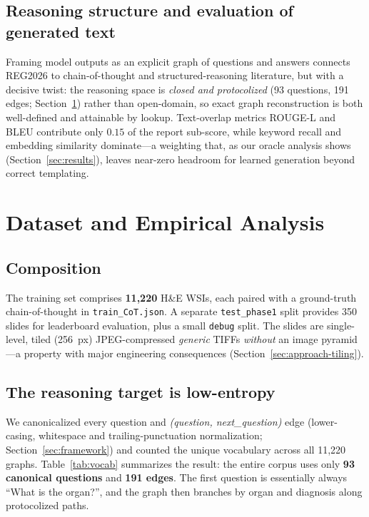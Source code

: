 \documentclass[11pt,a4paper]{article}
\newcommand{\code}[1]{\texttt{\small #1}}
\begin{document}
\subsection{Reasoning structure and evaluation of generated text}
Framing model outputs as an explicit graph of questions and answers connects REG2026 to
chain-of-thought and structured-reasoning literature, but with a decisive twist: the reasoning
space is \emph{closed and protocolized} (93 questions, 191 edges; Section~\ref{sec:data}) rather
than open-domain, so exact graph reconstruction is both well-defined and attainable by lookup.
Text-overlap metrics ROUGE-L \cite{lin2004rouge} and BLEU \cite{papineni2002bleu} contribute only
$0.15$ of the report sub-score, while keyword recall and embedding similarity dominate---a
weighting that, as our oracle analysis shows (Section~\ref{sec:results}), leaves near-zero
headroom for learned generation beyond correct templating.

\section{Dataset and Empirical Analysis}
\label{sec:data}

\subsection{Composition}
The training set comprises \textbf{11{,}220} H\&E WSIs, each paired with a ground-truth
chain-of-thought in \code{train\_CoT.json}. A separate \code{test\_phase1} split provides 350
slides for leaderboard evaluation, plus a small \code{debug} split. The slides are
single-level, tiled (256~px) JPEG-compressed \emph{generic} TIFFs \emph{without} an image
pyramid---a property with major engineering consequences (Section~\ref{sec:approach-tiling}).

\subsection{The reasoning target is low-entropy}
\label{sec:purity}
We canonicalized every question and \emph{(question, next\_question)} edge (lower-casing,
whitespace and trailing-punctuation normalization; Section~\ref{sec:framework}) and counted the
unique vocabulary across all 11{,}220 graphs. Table~\ref{tab:vocab} summarizes the result: the
entire corpus uses only \textbf{93 canonical questions} and \textbf{191 edges}. The first
question is essentially always ``What is the organ?'', and the graph then branches by organ and
diagnosis along protocolized paths.
\end{document}
